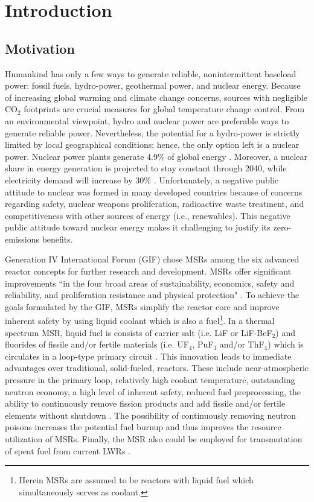 \chapter[Introduction]{Introduction}
\section{Motivation}
Humankind has only a few ways to generate reliable, nonintermittent 
baseload power: fossil fuels, hydro-power, geothermal power, and 
nuclear energy. Because of increasing global warming and climate 
change concerns, sources with negligible CO$_2$ footprints 
are crucial measures for global temperature change control. 
From an environmental viewpoint, hydro and nuclear power are 
preferable ways to generate reliable power. Nevertheless, the 
potential for a hydro-power is strictly limited by local geographical 
conditions; hence, the only option left is a nuclear power. Nuclear 
power plants generate 4.9\% of global energy \cite{noauthor_key_2017}. 
Moreover, a nuclear share in energy generation is projected to stay 
constant through 2040, while electricity demand will 
increase by 30\% \cite{noauthor_world_2017}. Unfortunately, a negative 
public attitude to nuclear was formed in many developed countries 
because of concerns regarding safety, nuclear weapons 
proliferation, radioactive waste treatment, and competitiveness with 
other sources of energy (i.e., renewables). This negative public 
attitude toward nuclear energy makes it challenging to justify its 
zero-emissions benefits.

Generation IV International Forum (GIF) chose \glspl{MSR} among the six 
advanced reactor concepts for further research and development. \glspl{MSR} 
offer significant improvements ``in the four broad areas of sustainability, 
economics, safety and reliability, and proliferation resistance and physical 
protection" \cite{doe_technology_2002}. To achieve the goals formulated by the 
GIF, \glspl{MSR} simplify the reactor core and improve inherent safety by 
using liquid coolant which is also a fuel\footnote{Herein \glspl{MSR} are 
assumed to be reactors with liquid fuel which simultaneously serves 
as coolant.}. In a thermal spectrum \gls{MSR}, liquid fuel is consists 
of carrier salt (i.e. LiF or LiF-BeF$_2$) and fluorides of fissile 
and/or fertile materials (i.e. UF$_4$, PuF$_3$ and/or ThF$_4$) 
which is circulates in a loop-type primary circuit 
\cite{haubenreich_experience_1970}. 
This innovation leads to immediate advantages over traditional, 
solid-fueled, reactors. These include near-atmospheric pressure 
in the primary loop, relatively high coolant temperature, outstanding 
neutron economy, a high level of inherent safety, reduced fuel 
preprocessing, the ability to continuously remove fission products 
and add fissile and/or fertile elements without shutdown 
\cite{leblanc_molten_2010}. The possibility of continuously removing 
neutron poisons increases the potential fuel burnup and thus 
improves the resource utilization of \glspl{MSR}. Finally, the \gls{MSR} 
also could be employed for transmutation of 
spent fuel from current \glspl{LWR} \cite{fratoni_design_2004}.

